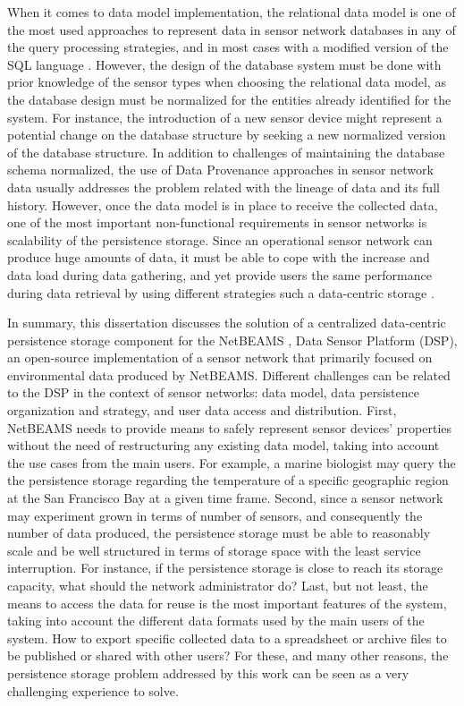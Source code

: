 When it comes to data model implementation, the relational data model
\cite{db01} is one of the most used approaches to represent data in sensor 
network databases in any of the query processing strategies, and in most cases 
with a modified version of the SQL language \cite{sn-db-newop01}
\cite{sn-db-newop02}. However, the design of the database system must be done
with prior knowledge of the sensor types when  choosing the relational data
model, as the database design must be normalized \cite{db02} for the entities
already identified for the system. For instance, the introduction of a new
sensor device might represent a potential change on the database structure by
seeking a new normalized version of the database structure. In addition to
challenges of maintaining the database schema normalized, the use of Data
Provenance approaches in sensor network data \cite{sn-provenance01} usually
addresses the problem related with the lineage of data  and its full history.
However, once the data model is in place to receive the collected data, one of
the most important non-functional requirements in sensor networks is
scalability of the persistence storage. Since an operational sensor network
can produce huge amounts of data, it must be able to cope with the increase
and data load during data gathering, and yet provide users the same
performance during data retrieval by using different strategies such a
data-centric storage \cite{sn-storage03}.

In summary, this dissertation discusses the solution of a centralized
data-centric persistence storage component for the NetBEAMS \cite{nb01}, Data
Sensor Platform (DSP), an open-source \cite{se01} implementation of a sensor
network that primarily focused on environmental data produced by NetBEAMS. 
Different challenges can be related to the DSP in the context of sensor 
networks: data model, data persistence organization and strategy, and user data
access and distribution. First, NetBEAMS needs to provide means to safely 
represent sensor devices' properties without the need of restructuring any 
existing data model, taking into account the use cases from the main users. 
For example, a marine biologist may query the the persistence storage regarding
the temperature of a specific geographic region at the San Francisco Bay at a 
given time frame. Second, since a sensor network may experiment grown in terms 
of number of sensors, and consequently the number of data produced, the
persistence  storage must be able to reasonably scale and be well structured
in terms of storage space with the least service interruption. For instance,
if the persistence storage is close to reach its storage capacity, what
should the network administrator do? Last, but not least, the means to access 
the data for reuse is the most important features of the system, taking into 
account the different data formats used by the main users of the system. How 
to export specific collected data to a spreadsheet or archive files to be 
published or shared with other users? For these, and many other reasons, the 
persistence storage problem addressed by this work can be seen as a very 
challenging experience to solve.

